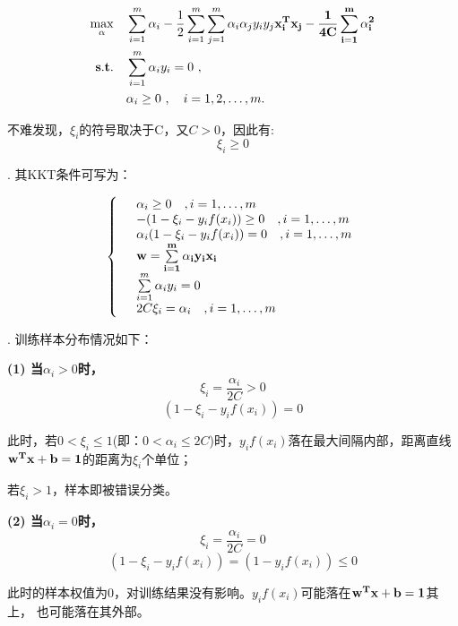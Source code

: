 \documentclass[12pt,a4paper]{article}
\begin{document}
\begin{spacing}{1.3}
\begin{equation}
    \begin{split}
        \bf{\max_{\alpha}} &\quad \sum\limits_{i=1}^{m}\alpha_{i} - 
        \dfrac{1}{2}\sum\limits_{i=1}^{m}\sum\limits_{j=1}^{m}\alpha_{i}\alpha_{j}y_{i}y_{j}\bf{x_{i}^{T}x_{j}}
        -\dfrac{1}{4C}\sum\limits_{i=1}^{m}  \alpha_{i}^{2} \\
        \bf{s.t.} &\quad \sum\limits_{i=1}^{m} \alpha_{i}y_{i} = 0 \ , \\
        & \quad \alpha_{i} \ge 0 \ , \quad i=1,2,\dots,m . \nonumber
    \end{split}
\end{equation}
\par 不难发现，$\xi_{i}$的符号取决于C，又$C>0$，因此有:$$\xi_{i} \ge 0$$
\par {}. 其KKT条件可写为：
    \begin{spacing}{1.5}
        \[\left\{\begin{array}{ll}
            &\alpha_{i} \ge 0   \quad , i=1,\dots , m     \\
            & -(1-\xi_{i}-y_{i}f(x_{i})) \ge 0   \quad , i=1,\dots , m \\
            &\alpha_{i}(1-\xi_{i}-y_{i}f(x_{i})) = 0  \quad , i=1,\dots , m\\
            &\bf{w}= \sum\limits_{i=1}^{m}\alpha_{i}y_{i}\bf{x_{i}} \\
            &\sum\limits_{i=1}^{m} \alpha_{i}y_{i} =0    \\
            & 2C\xi_{i}=\alpha_{i} \quad , i=1,\dots , m
        \end{array}\right. \]
    \end{spacing}

\par {}. 训练样本分布情况如下：
\par \noindent \textbf{(1) 当$\alpha_{i} > 0$时，}
$$\xi_{i} =\dfrac{\alpha_{i}}{2C}> 0$$
$$(1-\xi_{i}-y_{i}f(x_{i})) =0$$
\par 此时，若$ 0<\xi_{i} \le 1$(即：$0 < \alpha_{i} \le 2C$)时，$y_{i}f(x_{i})$落在最大间隔内部，距离直线$\bf{w^{T}x}+b=1 $的距离为$\xi_{i}$个单位；
\par 若$\xi_{i}>1$，样本即被错误分类。\\
\par \noindent \textbf{(2) 当$\alpha_{i} = 0$时，}
$$\xi_{i} =\dfrac{\alpha_{i}}{2C}=0  $$
$$(1-\xi_{i}-y_{i}f(x_{i}))=(1-y_{i}f(x_{i})) \le 0$$
\par 此时的样本权值为0，对训练结果没有影响。$y_{i}f(x_{i})$可能落在$\bf{w^{T}x}+b=1$其上，
也可能落在其外部。
\end{spacing}
\end{document}
